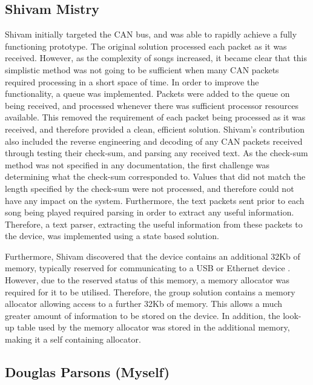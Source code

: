 \subsection*{Shivam Mistry}
Shivam initially targeted the CAN bus, and was able to rapidly achieve a fully 
functioning prototype. The original solution processed each packet as it was 
received. However, as the complexity of songs increased, it became clear that this 
simplistic method was not going to be sufficient when many CAN packets required
processing in a short space of time.
In order to improve the functionality, a queue was implemented. Packets were 
added to the queue on being received, and processed whenever there was sufficient
processor resources available.
This removed the requirement of each packet being processed as it was received,
 and therefore provided a clean, efficient solution.
Shivam's contribution also included the reverse engineering and decoding of any
 CAN packets received through testing their check-sum, and parsing any received 
text.
As the check-sum method was not specified in any documentation, the first 
challenge was determining what the check-sum corresponded to. Values that did 
not match the length specified by the check-sum were not processed, and therefore 
could not have any impact on the system. Furthermore, the text packets sent prior 
to each song being played required parsing in order to extract any useful 
information. Therefore, a text parser, extracting the useful information from 
these packets to the device, was implemented using a state based solution. 
\par\bigskip\noindent
Furthermore, Shivam 
discovered that the device contains an additional 32Kb of memory, 
typically reserved for communicating to a USB or Ethernet device \cite{lpc1768-datasheet}.
However, due to the reserved status of this memory, a memory allocator was 
required for it to be utilised. 
Therefore, the group solution contains a memory allocator allowing access to 
a further 32Kb of memory. This allows a much greater amount of information to be 
stored on the device. 
In addition, the look-up table used by the memory allocator was stored in the 
additional memory, making it a self containing allocator. 

\subsection*{Douglas Parsons (Myself)}

